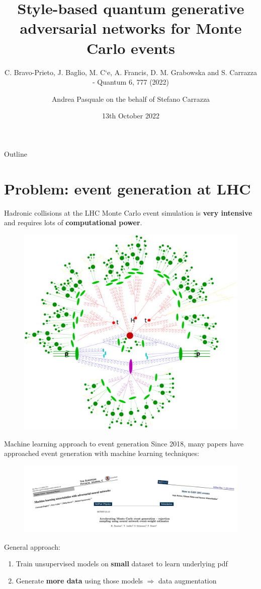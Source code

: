\documentclass[11pt,aspectratio=169]{beamer}
\title{Style-based quantum generative adversarial networks for Monte Carlo events}
\subtitle{\scriptsize C. Bravo-Prieto, J. Baglio, M. C`e, A. Francis, D. M. Grabowska and S. Carrazza - Quantum 6, 777 (2022)}
\author{Andrea Pasquale on the behalf of Stefano Carrazza}
\date{13th October 2022}
\begin{document}
\maketitle

\begin{frame}{Outline}
\tableofcontents
\end{frame}
\section{Problem: event generation at LHC}

\begin{frame}{Hadronic collisions at the LHC}
    Monte Carlo event simulation is {\color{red}\textbf{very intensive}} and requires lots of {\color{blue}\textbf{computational power}}.
    \begin{figure}
        \includegraphics[width=0.6 \textwidth]{figures/sherpa-sim.jpg}
    \end{figure}
\end{frame}

\begin{frame}{Machine learning approach to event generation}
    Since 2018, many papers have approached event generation with machine learning techniques:
    \begin{figure}
        \includegraphics[width=\textwidth]{figures/ml_papers.png}
    \end{figure}
    General approach:
    \begin{enumerate}
        \item Train unsupervised models on \textbf{small} dataset to learn underlying pdf
        \item Generate \textbf{more data} using those models $\Rightarrow$ data augmentation
    \end{enumerate}
    
\end{frame}
\end{document}

